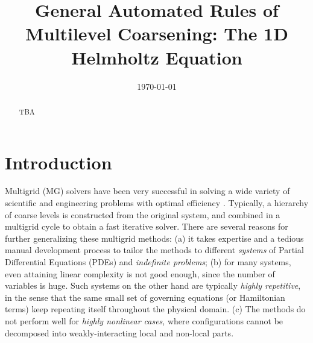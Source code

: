 \documentclass{article}
\title{General Automated Rules of Multilevel Coarsening: The 1D Helmholtz Equation}
\author{}
\date{\today}
\begin{document}
\maketitle

\begin{abstract}
TBA


\end{abstract}

\section{Introduction}
\label{intro}
Multigrid (MG) solvers have been very successful in solving a wide variety of scientific and engineering problems with optimal efficiency \cite{review}. Typically, a hierarchy of coarse levels is constructed from the original system, and combined in a multigrid cycle to obtain a fast iterative solver. There are several reasons for further generalizing these multigrid methods: (a) it takes expertise and a tedious manual development process to tailor the methods to different \emph{systems} of Partial Differential Equations (PDEs) and \emph{indefinite problems}; (b) for many systems, even attaining linear complexity is not good enough, since the number of variables is huge. Such systems on the other hand are typically \emph{highly repetitive}, in the sense that the same small set of governing equations (or Hamiltonian terms) keep repeating itself throughout the physical domain. (c) The methods do not perform well for \emph{highly nonlinear cases}, where configurations cannot be decomposed into weakly-interacting local and non-local parts.
\end{document}

